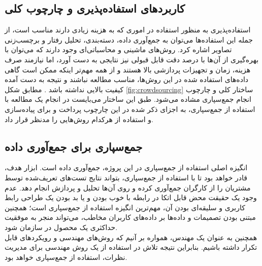\subsection{کاربردهای استفاده‌پذیری و چارچوب کلی}
استفاده‌پذیری به منظور استفاده در اموری که به هزینه زیادی دارند مناسب است، از جمله این استفاده‌ها می‌توان به جمع‌آوری داده، دسته‌بندی، تحلیل رفتار و برچسب‌زنی تصاویر اشاره کرد. روش‌های ماشینی و محاسباتی‌ای وجود دارند که می‌توان با بهره‌گیری از آن‌ها با درصد دقت قابل قبولی نیز نتایجی به دست آورد، اما نیازمند صرف هزینه، زمان و تجهیزات پردازشی بالا هستند و از همه مهم‌تر اینکه ممکن است گاهی داده‌های استفاده شده در این روش‌ها، مناسب مطالعه نباشند و نتیجه به دست آمده کیفیت بالایی نداشته باشد
\cite{li_crowdsourced_2016}.
مطابق شکل
\ref{fig:crowdsourcing}
ساختار کلی و چارچوب انجام جمع‌سپاری مشاده می‌شود. طبق این ساختار می‌بایست در انجام یک مطالعه با استفاده از جمع‌سپاری، به اجزای ذکر شده در این چارچوب پرداخت و برای پیاده‌سازی و استفاده از هرکدام روش‌هایی را مدنظر قرار داد.
\subsection{جمع‌سپاری برای جمع‌آوری داده}
انگیزه اصلی استفاده از جمع‌سپاری در این پروژه، جمع‌آوری داده است. ابزار هدف، قادر خواهد بود تا با استفاده از جمع‌سپاری، بتواند نتایج تست‌های تعریف‌شده توسط مشتریان را از کارگران جمع‌آوری کرده و روی آن‌ها تحلیل و پردازش انجام دهد. عدم وجود یک حقیقت محض قابل اتکا
در رابطه با خوب بودن و یا بد بودن یک طراحی رابط کاربری و سلیقه‌ای بودن آن، مهم‌ترین انگیزه استفاده از جمع‌سپاری است؛ همچنین مبتنی بودن تصمیمات و داده‌ها بر داده‌های کاربران مخاطب، می‌تواند منجر به موفقیت حداکثری یک محصول در سازمان شود.\\
همچنین به عنوان یک مهندس، همواره بر آنیم که روش‌های مهندسی و رویکردهای قابل تکرار داشته باشیم. بنابراین نتیجه تلاش در استفاده از یک روش مهندسی برای مدیریت نظرات، استفاده از جمع‌سپاری خواهد بود.
